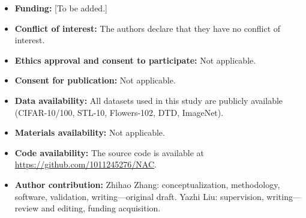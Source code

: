 \documentclass[pdflatex,sn-basic,Numbered]{sn-jnl}
\theoremstyle{thmstyleone}
\theoremstyle{thmstyletwo}
\theoremstyle{thmstylethree}
\begin{document}
\begin{itemize}
\item \textbf{Funding:} [To be added.]
\item \textbf{Conflict of interest:} The authors declare that they have no conflict of interest.
\item \textbf{Ethics approval and consent to participate:} Not applicable.
\item \textbf{Consent for publication:} Not applicable.
\item \textbf{Data availability:} All datasets used in this study are publicly available (CIFAR-10/100, STL-10, Flowers-102, DTD, ImageNet).
\item \textbf{Materials availability:} Not applicable.
\item \textbf{Code availability:} The source code is available at \url{https://github.com/1011245276/NAC}.
\item \textbf{Author contribution:} Zhihao Zhang: conceptualization, methodology, software, validation, writing---original draft. Yazhi Liu: supervision, writing---review and editing, funding acquisition.
\end{itemize}


\end{document}

